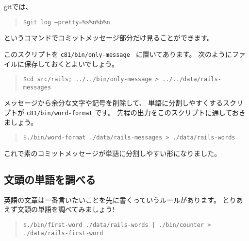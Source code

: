 \documentclass{jarticle}
\begin{document}
gitでは、
\begin{quote}
{\tt \$git log --pretty=\%s\%n\%b\%n}
\end{quote}

というコマンドでコミットメッセージ部分だけ見ることができます。

このスクリプトを {\tt c81/bin/only-message } に置いてあります。
次のようにファイルに保存しておくとよいでしょう。
\begin{quote}
{\tt \$cd src/rails; ../../bin/only-message > ../../data/rails-messages }
\end{quote}

メッセージから余分な文字や記号を削除して、
単語に分割しやすくするスクリプトが {\tt c81/bin/word-format} です。
先程の出力をこのスクリプトに通しておきましょう。
\begin{quote}
{\tt \$./bin/word-format ./data/rails-messages > ./data/rails-words }
\end{quote}

これで素のコミットメッセージが単語に分割しやすい形になりました。


  \subsection{文頭の単語を調べる}
  英語の文章は一番言いたいことを先に書くっていうルールがあります。
  とりあえず文頭の単語を調べてみましょう!
  \begin{quote}
   {\tt \$./bin/first-word ./data/rails-words | ./bin/counter > ./data/rails-first-word}
  \end{quote}
\end{document}

